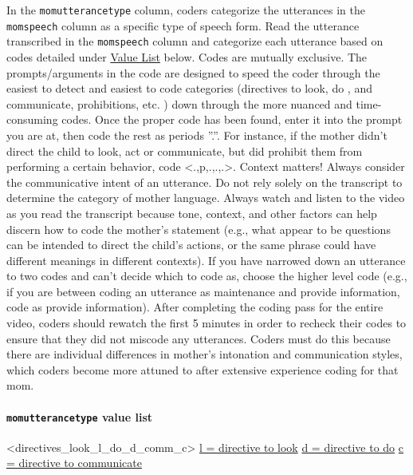 \documentclass[
]{book}
\begin{document}
In the \texttt{momutterancetype} column, coders categorize the utterances in the \texttt{momspeech} column as a specific type of speech form. Read the utterance transcribed in the \texttt{momspeech} column and categorize each utterance based on codes detailed under \protect\hyperlink{momutterancetype_value_list}{Value List} below.
Codes are mutually exclusive. The prompts/arguments in the code are designed to speed the coder through the easiest to detect and easiest to code categories (directives to look, do , and communicate, prohibitions, etc. ) down through the more nuanced and time-consuming codes. Once the proper code has been found, enter it into the prompt you are at, then code the rest as periods ''.''. For instance, if the mother didn't direct the child to look, act or communicate, but did prohibit them from performing a certain behavior, code \textless.,p,.,.,.\textgreater.
Context matters! Always consider the communicative intent of an utterance.
Do not rely solely on the transcript to determine the category of mother language. Always watch and listen to the video as you read the transcript because tone, context, and other factors can help discern how to code the mother's statement (e.g., what appear to be questions can be intended to direct the child's actions, or the same phrase could have different meanings in different contexts). If you have narrowed down an utterance to two codes and can't decide which to code as, choose the higher level code (e.g., if you are between coding an utterance as maintenance and provide information, code as provide information).
After completing the coding pass for the entire video, coders should rewatch the first 5 minutes in order to recheck their codes to ensure that they did not miscode any utterances. Coders must do this because there are individual differences in mother's intonation and communication styles, which coders become more attuned to after extensive experience coding for that mom.

\hypertarget{momutterancetype_value_list}{%
\paragraph*{\texorpdfstring{\texttt{momutterancetype} value list}{momutterancetype value list}}\label{momutterancetype_value_list}}

\textless directives\_look\_l\_do\_d\_comm\_c\textgreater{}
\protect\hyperlink{directive_to_look}{l = directive to look}
\protect\hyperlink{directive_to_do}{d = directive to do}
\protect\hyperlink{directive_to_communicate}{c = directive to communicate}
\end{document}
